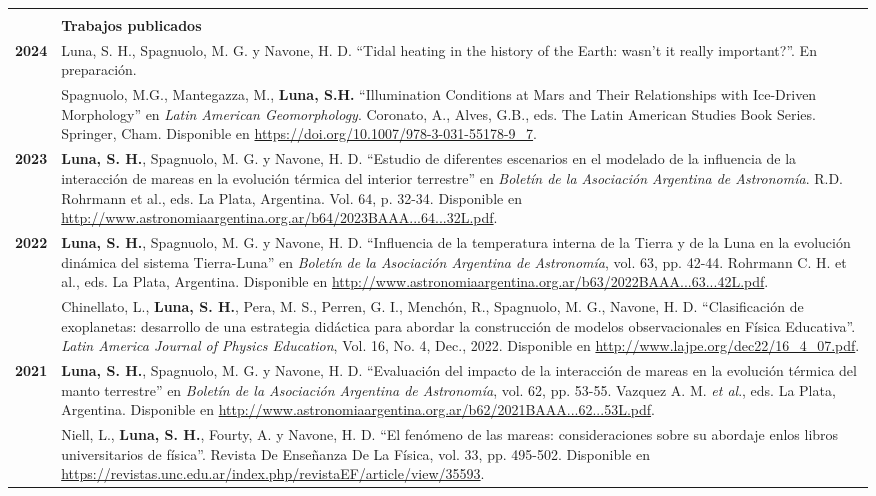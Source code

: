 \documentclass[12pt,a4paper]{article}
\begin{document}
\begin{longtable}[t]{r p{12cm}}
 & \\
 & \textbf{Trabajos publicados} \\
\cline{2-2}
\textbf{2024} & Luna, S. H., Spagnuolo, M. G. y Navone, H. D. ``Tidal heating in the history of the Earth: wasn't it really important?''. En preparación. \\
              & Spagnuolo, M.G., Mantegazza, M., \textbf{Luna, S.H.} ``Illumination Conditions at Mars and Their Relationships with Ice-Driven Morphology'' en \textit{Latin American Geomorphology}. Coronato, A., Alves, G.B., eds. The Latin American Studies Book Series. Springer, Cham. Disponible en \url{https://doi.org/10.1007/978-3-031-55178-9_7}. \\
\textbf{2023} & \textbf{Luna, S. H.}, Spagnuolo, M. G. y Navone, H. D. ``Estudio de diferentes escenarios en el modelado de la influencia de la interacción de mareas en la evolución térmica del interior terrestre'' en  
\textit{Boletín de la Asociación Argentina de Astronomía}. R.D. Rohrmann et al., eds. La Plata, Argentina. Vol. 64, p. 32-34. Disponible en \url{http://www.astronomiaargentina.org.ar/b64/2023BAAA...64...32L.pdf}. \\
\textbf{2022} & \textbf{Luna, S. H.}, Spagnuolo, M. G. y Navone, H. D. “Influencia de la temperatura interna de la Tierra y de la Luna en la evolución dinámica del sistema Tierra-Luna” en \textit{Boletín de la Asociación Argentina de Astronomía}, vol. 63, pp. 42-44. Rohrmann C. H. et al., eds. La Plata, Argentina. Disponible en \url{http://www.astronomiaargentina.org.ar/b63/2022BAAA...63...42L.pdf}. \\
              & Chinellato, L., \textbf{Luna, S. H.}, Pera, M. S., Perren, G. I., Menchón,
              R., Spagnuolo, M. G., Navone, H. D. “Clasificación de exoplanetas: desarrollo de una estrategia didáctica para abordar la construcción de modelos observacionales en Física Educativa”. \textit{Latin America Journal of Physics Education}, Vol. 16, No. 4, Dec., 2022. Disponible en \url{http://www.lajpe.org/dec22/16_4_07.pdf}. \\
\textbf{2021} & \textbf{Luna, S. H.}, Spagnuolo, M. G. y Navone, H. D. ``Evaluación del impacto de la interacción de mareas en la evolución térmica del manto terrestre'' en \textit{Boletín de la Asociación Argentina de Astronomía}, vol. 62, pp. 53-55. Vazquez A. M. \textit{et al}., eds. La Plata, Argentina. Disponible en \url{http://www.astronomiaargentina.org.ar/b62/2021BAAA...62...53L.pdf}. \\
              & Niell, L., \textbf{Luna, S. H.}, Fourty, A. y Navone, H. D. ``El fenómeno de las mareas: consideraciones sobre su abordaje enlos libros universitarios de física''. Revista De Enseñanza De La Física, vol. 33, pp. 495-502. Disponible en \url{https://revistas.unc.edu.ar/index.php/revistaEF/article/view/35593}. \\

\end{longtable}
\end{document}

